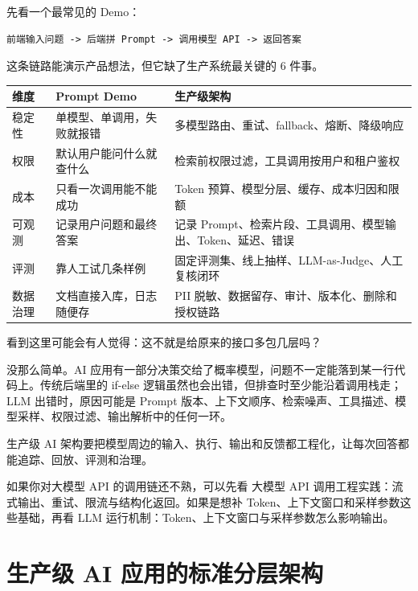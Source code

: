\documentclass[10pt,a4paper]{ctexart}
\begin{document}
先看一个最常见的 Demo：



\begin{lstlisting}
前端输入问题 -> 后端拼 Prompt -> 调用模型 API -> 返回答案
\end{lstlisting}



这条链路能演示产品想法，但它缺了生产系统最关键的 6 件事。


{\footnotesize
\begin{tabularx}{\textwidth}{|X|X|X|}
\hline
\textbf{维度} & \textbf{Prompt Demo} & \textbf{生产级架构} \\
\hline
稳定性 & 单模型、单调用，失败就报错 & 多模型路由、重试、fallback、熔断、降级响应 \\
\hline
权限 & 默认用户能问什么就查什么 & 检索前权限过滤，工具调用按用户和租户鉴权 \\
\hline
成本 & 只看一次调用能不能成功 & Token 预算、模型分层、缓存、成本归因和限额 \\
\hline
可观测 & 记录用户问题和最终答案 & 记录 Prompt、检索片段、工具调用、模型输出、Token、延迟、错误 \\
\hline
评测 & 靠人工试几条样例 & 固定评测集、线上抽样、LLM-as-Judge、人工复核闭环 \\
\hline
数据治理 & 文档直接入库，日志随便存 & PII 脱敏、数据留存、审计、版本化、删除和授权链路 \\
\hline
\end{tabularx}
}



看到这里可能会有人觉得：这不就是给原来的接口多包几层吗？



没那么简单。AI 应用有一部分决策交给了概率模型，问题不一定能落到某一行代码上。传统后端里的 if-else 逻辑虽然也会出错，但排查时至少能沿着调用栈走；LLM 出错时，原因可能是 Prompt 版本、上下文顺序、检索噪声、工具描述、模型采样、权限过滤、输出解析中的任何一环。



生产级 AI 架构要把模型周边的输入、执行、输出和反馈都工程化，让每次回答都能追踪、回放、评测和治理。



如果你对大模型 API 的调用链还不熟，可以先看 大模型 API 调用工程实践：流式输出、重试、限流与结构化返回。如果是想补 Token、上下文窗口和采样参数这些基础，再看 LLM 运行机制：Token、上下文窗口与采样参数怎么影响输出。



\section{生产级 AI 应用的标准分层架构}
\end{document}
